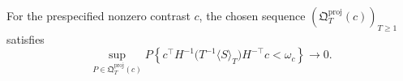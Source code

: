 For the prespecified nonzero contrast \(c\), the chosen sequence \((\mathfrak Q_T^{\mathrm{proj}}(c))_{T\ge1}\) satisfies
\[
 \sup_{P\in\mathfrak Q_T^{\mathrm{proj}}(c)}
 P\!\left\{
 c^\top H^{-1}\bigl(T^{-1}\langle S\rangle_T\bigr)H^{-\top}c<\omega_c
 \right\}\longrightarrow0.
\]